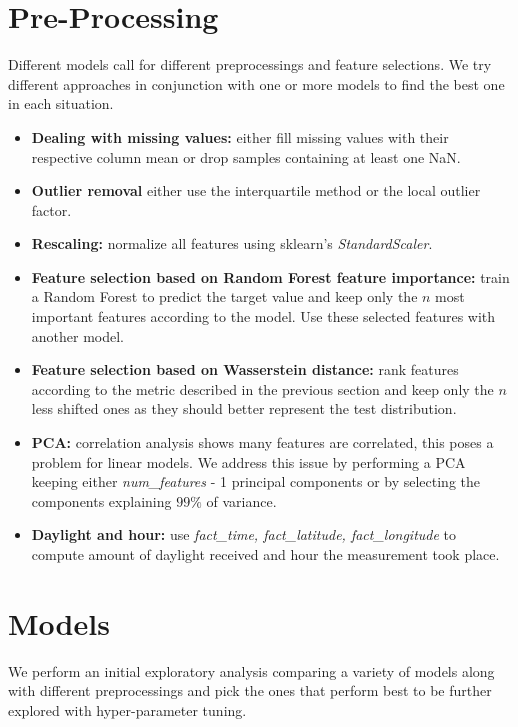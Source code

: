 \documentclass{article}
\begin{document}
    \section{Pre-Processing}
    Different models call for different preprocessings and feature selections. We try different approaches in conjunction with one or more models to find the best one in each situation.
    \begin{itemize}
        \item \textbf{Dealing with missing values:} either fill missing values with their respective column mean or drop samples containing at least one NaN.
        \item \textbf{Outlier removal} either use the interquartile method or the local outlier factor.
        \item \textbf{Rescaling:} normalize all features using sklearn's \textit{StandardScaler}.
        \item \textbf{Feature selection based on Random Forest feature importance:} train a Random Forest to predict the target value and  keep only the $n$ most important features according to the model. Use these selected features with another model.
        \item \textbf{Feature selection based on Wasserstein distance:} rank features according to the metric described in the previous section and keep only the $n$ less shifted ones as they should better represent the test distribution.
        \item \textbf{PCA:} correlation analysis shows many features are correlated, this poses a problem for linear models. We address this issue by performing a PCA keeping either \textit{num\_features} - 1 principal components or by selecting the components explaining $99\%$ of variance.
        \item \textbf{Daylight and hour:} use \textit{fact\_time, fact\_latitude, fact\_longitude} to compute amount of daylight received and hour the measurement took place.
    \end{itemize} 
    
    \section{Models}
    We perform an initial exploratory analysis comparing a variety of models along with different preprocessings and pick the ones that perform best to be further explored with hyper-parameter tuning. 
    
\end{document}
